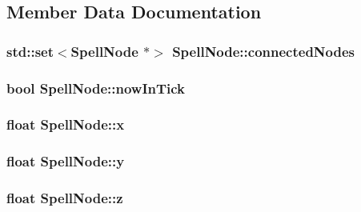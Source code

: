 \subsection{Member Data Documentation}
\hypertarget{class_spell_node_a5073f68f588de6227430cb0abe3e161a}{
\subsubsection[{connected\-Nodes}]{\setlength{\rightskip}{0pt plus 5cm}std\-::set$<${\bf Spell\-Node} $\ast$$>$ Spell\-Node\-::connected\-Nodes\hspace{0.3cm}{\ttfamily [protected]}}}\label{class_spell_node_a5073f68f588de6227430cb0abe3e161a}
\hypertarget{class_spell_node_a334bcdb7648ffd704510a6b277057fa5}{
\subsubsection[{now\-In\-Tick}]{\setlength{\rightskip}{0pt plus 5cm}bool Spell\-Node\-::now\-In\-Tick\hspace{0.3cm}{\ttfamily [protected]}}}\label{class_spell_node_a334bcdb7648ffd704510a6b277057fa5}
\hypertarget{class_spell_node_a916f2a709a674dd2a61530b6acc339cc}{
\subsubsection[{x}]{\setlength{\rightskip}{0pt plus 5cm}float Spell\-Node\-::x\hspace{0.3cm}{\ttfamily [protected]}}}\label{class_spell_node_a916f2a709a674dd2a61530b6acc339cc}
\hypertarget{class_spell_node_a754d80fd0fd82dbc12443b5f277b9fb4}{
\subsubsection[{y}]{\setlength{\rightskip}{0pt plus 5cm}float Spell\-Node\-::y\hspace{0.3cm}{\ttfamily [protected]}}}\label{class_spell_node_a754d80fd0fd82dbc12443b5f277b9fb4}
\hypertarget{class_spell_node_aff090331ff1bd816a22e974a50c1a180}{
\subsubsection[{z}]{\setlength{\rightskip}{0pt plus 5cm}float Spell\-Node\-::z\hspace{0.3cm}{\ttfamily [protected]}}}\label{class_spell_node_aff090331ff1bd816a22e974a50c1a180}


